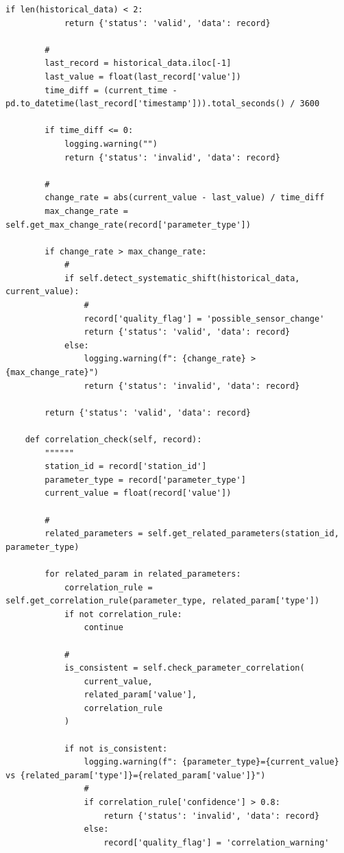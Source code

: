 \begin{lstlisting}[style=python]
        if len(historical_data) < 2:
            return {'status': 'valid', 'data': record}
        
        # 
        last_record = historical_data.iloc[-1]
        last_value = float(last_record['value'])
        time_diff = (current_time - pd.to_datetime(last_record['timestamp'])).total_seconds() / 3600
        
        if time_diff <= 0:
            logging.warning("")
            return {'status': 'invalid', 'data': record}
        
        # 
        change_rate = abs(current_value - last_value) / time_diff
        max_change_rate = self.get_max_change_rate(record['parameter_type'])
        
        if change_rate > max_change_rate:
            # 
            if self.detect_systematic_shift(historical_data, current_value):
                # 
                record['quality_flag'] = 'possible_sensor_change'
                return {'status': 'valid', 'data': record}
            else:
                logging.warning(f": {change_rate} > {max_change_rate}")
                return {'status': 'invalid', 'data': record}
        
        return {'status': 'valid', 'data': record}
    
    def correlation_check(self, record):
        """"""
        station_id = record['station_id']
        parameter_type = record['parameter_type']
        current_value = float(record['value'])
        
        # 
        related_parameters = self.get_related_parameters(station_id, parameter_type)
        
        for related_param in related_parameters:
            correlation_rule = self.get_correlation_rule(parameter_type, related_param['type'])
            if not correlation_rule:
                continue
            
            # 
            is_consistent = self.check_parameter_correlation(
                current_value, 
                related_param['value'],
                correlation_rule
            )
            
            if not is_consistent:
                logging.warning(f": {parameter_type}={current_value} vs {related_param['type']}={related_param['value']}")
                # 
                if correlation_rule['confidence'] > 0.8:
                    return {'status': 'invalid', 'data': record}
                else:
                    record['quality_flag'] = 'correlation_warning'
        

\end{lstlisting}
